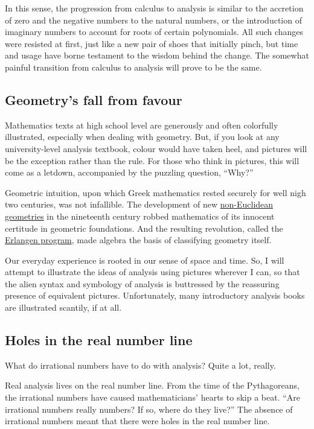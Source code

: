 \documentclass[
  a4paper,
]{article}
\begin{document}
In this sense, the progression from calculus to analysis is similar to
the accretion of zero and the negative numbers to the natural numbers,
or the introduction of imaginary numbers to account for roots of certain
polynomials. All such changes were resisted at first, just like a new
pair of shoes that initially pinch, but time and usage have borne
testament to the wisdom behind the change. The somewhat painful
transition from calculus to analysis will prove to be the same.

\subsection{Geometry's fall from
favour}\label{geometrys-fall-from-favour}

Mathematics texts at high school level are generously and often
colorfully illustrated, especially when dealing with geometry. But, if
you look at any university-level analysis textbook, colour would have
taken heel, and pictures will be the exception rather than the rule. For
those who think in pictures, this will come as a letdown, accompanied by
the puzzling question, ``Why?''

Geometric intuition, upon which Greek mathematics rested securely for
well nigh two centuries, was not infallible. The development of new
\href{https://en.wikipedia.org/wiki/Non-Euclidean_geometry}{non-Euclidean
geometries} in the nineteenth century robbed mathematics of its innocent
certitude in geometric foundations. And the resulting revolution, called
the \href{https://en.wikipedia.org/wiki/Erlangen_program}{Erlangen
program}, made algebra the basis of classifying geometry itself.

Our everyday experience is rooted in our sense of space and time. So, I
will attempt to illustrate the ideas of analysis using pictures wherever
I can, so that the alien syntax and symbology of analysis is buttressed
by the reassuring presence of equivalent pictures. Unfortunately, many
introductory analysis books are illustrated scantily, if at all.

\subsection{Holes in the real number
line}\label{holes-in-the-real-number-line}

What do irrational numbers have to do with analysis? Quite a lot,
really.

Real analysis lives on the real number line. From the time of the
Pythagoreans, the irrational numbers have caused mathematicians' hearts
to skip a beat. ``Are irrational numbers really numbers? If so, where do
they live?'' The absence of irrational numbers meant that there were
holes in the real number line.
\end{document}
